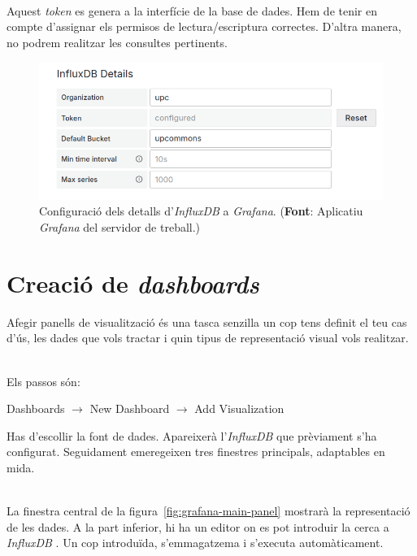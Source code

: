 \noindent \\
Aquest \textit{token} es genera a la interfície de la base de dades.
Hem de tenir en compte d'assignar els permisos de lectura/escriptura correctes.
D'altra manera, no podrem realitzar les consultes pertinents.

\begin{figure}[htbp]
    \centerline{\includegraphics[width=\textwidth]{figures/grafana-influxdb-details}}
    \captionsetup{justification=centering}
    \caption[Configuració dels detalls d'\textit{InfluxDB} a \textit{Grafana}.]{Configuració dels detalls d'\textit{InfluxDB} a \textit{Grafana}. (\textbf{Font}: Aplicatiu \textit{Grafana} del servidor de treball.)}\label{fig:grafana-influxdb-details}
\end{figure}

\clearpage

\section*{Creació de \textit{dashboards}}\label{sec:grafana-dashboards}

\noindent
Afegir panells de visualització és una tasca senzilla un cop tens definit el teu cas d'ús, les dades que vols tractar i quin tipus de representació visual vols realitzar.

\noindent \\
Els passos són:
\begin{center}
    Dashboards \(\rightarrow\) New Dashboard \(\rightarrow\) Add Visualization
\end{center}

\noindent
Has d'escollir la font de dades.
Apareixerà l'\textit{InfluxDB} que prèviament s'ha configurat.
Seguidament emeregeixen tres finestres principals, adaptables en mida.

\noindent \\
La finestra central de la figura~\ref{fig:grafana-main-panel} mostrarà la representació de les dades.
A la part inferior, hi ha un editor on es pot introduir la cerca a \textit{InfluxDB} .
Un cop introduïda, s'emmagatzema i s'executa automàticament.

